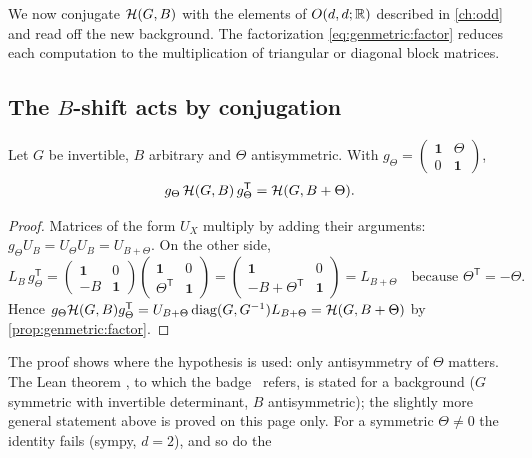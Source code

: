 We now conjugate $\mathcal{H}(G,B)$ with the elements of $O(d,d;\mathbb{R})$ described in \cref{ch:odd} and
read off the new background. The factorization \eqref{eq:genmetric:factor} reduces each
computation to the multiplication of triangular or diagonal block matrices.

\subsection{The \texorpdfstring{$B$}{B}-shift acts by conjugation}

\begin{theorem}[$B$-shift \TA]\label{thm:genmetric:bshift}
Let $G$ be invertible, $B$ arbitrary and $\Theta$ antisymmetric. With
$g_\Theta=\left(\begin{smallmatrix}\mathbf 1&\Theta\\0&\mathbf 1\end{smallmatrix}\right)$,
\begin{equation}\label{eq:genmetric:bshift}
 g_\Theta\,\mathcal{H}(G,B)\,g_\Theta^{\mathsf T}=\mathcal{H}(G,B+\Theta).
\end{equation}
\end{theorem}
\begin{proof}
Matrices of the form $U_X$ multiply by adding their arguments:
$g_\Theta U_B=U_\Theta U_B=U_{B+\Theta}$. On the other side,
\[
 L_B\,g_\Theta^{\mathsf T}
 =\begin{pmatrix}\mathbf 1&0\\-B&\mathbf 1\end{pmatrix}
 \begin{pmatrix}\mathbf 1&0\\\Theta^{\mathsf T}&\mathbf 1\end{pmatrix}
 =\begin{pmatrix}\mathbf 1&0\\-B+\Theta^{\mathsf T}&\mathbf 1\end{pmatrix}
 =L_{B+\Theta}\quad\text{because }\Theta^{\mathsf T}=-\Theta .
\]
Hence $g_\Theta\mathcal{H}(G,B)g_\Theta^{\mathsf T}=U_{B+\Theta}\operatorname{diag}(G,G^{-1})L_{B+\Theta}
=\mathcal{H}(G,B+\Theta)$ by \cref{prop:genmetric:factor}.
\end{proof}
\noindent The proof shows where the hypothesis is used: only antisymmetry of $\Theta$
matters. The Lean theorem , to which the badge \TA\ refers, is
stated for a background ($G$ symmetric with invertible determinant, $B$ antisymmetric);
the slightly more general statement above is proved on this page only. For a symmetric $\Theta\ne0$ the identity fails (sympy, $d=2$), and so do the
